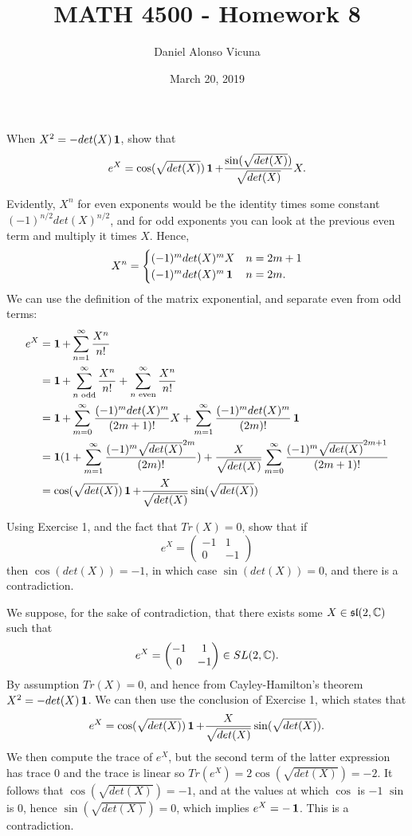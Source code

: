 \documentclass[12pt,onecolumn]{article}
\title{MATH 4500 - Homework 8}
\author{Daniel Alonso Vicuna}
\date{March 20, 2019}
\begin{document}
\maketitle

\begin{exercise}
When $X^2 = -det(X)\operatorname{\mathbf{1}}$, show that 
$$e^X = \cos(\sqrt{ det(X) })\operatorname{\mathbf{1}}+ \frac{\sin(\sqrt{ det(X) })}{\sqrt{det(X)}}
X.$$
\end{exercise}
\begin{answer}
Evidently, $X^n$ for even exponents would be the identity times some constant $(-1)^{n/2}det(X)^{n/2}$, and for odd exponents you can look at the previous even term and multiply it times $X$. Hence,  
$$X^n = 
\begin{cases}
    (-1)^mdet(X)^m X & n = 2m+1\\
    (-1)^mdet(X)^m \operatorname{\mathbf{1}} & n = 2m.
\end{cases}$$
We can use the definition of the matrix exponential, and separate even from odd terms:
\begin{align*}
    e^X &= \operatorname{\mathbf{1}} + \sum_{n=1}^\infty \frac{X^n}{n!} \\
    &= \operatorname{\mathbf{1}} + \sum_{n\text{ odd}}^\infty \frac{X^n}{n!}+ \sum_{n\text{ even}}^\infty \frac{X^n}{n!} \\
    &= \operatorname{\mathbf{1}} + \sum_{m=0}^\infty \frac{(-1)^{m}det(X)^{m}}{(2m+1)!}X + \sum_{m=1}^\infty \frac{(-1)^{m}det(X)^{m}}{(2m)!} \operatorname{\mathbf{1}} \\
    &= \operatorname{\mathbf{1}}(1 +  \sum_{m=1}^\infty \frac{(-1)^{m}\sqrt{det(X)}^{2m}}{(2m)!}) + \frac{X}{\sqrt{det(X)}}\sum_{m=0}^\infty \frac{(-1)^{m}\sqrt{det(X)}^{2m+1}}{(2m+1)!} \\
    &= \cos(\sqrt{det(X)})\operatorname{\mathbf{1}} + \frac{X}{\sqrt{det(X)}}\sin(\sqrt{det(X)})
\end{align*}
\end{answer}
\begin{exercise}
Using Exercise 1, and the fact that $Tr(X)=0$, show that if $$e^X =\begin{pmatrix}-1 & 1\\ 0 & -1\end{pmatrix}$$ then $\cos(det(X))=-1$, in which case $\sin(det(X))=0$, and there is a contradiction. 
\end{exercise}
\begin{answer}
We suppose, for the sake of contradiction, that there exists some $X \in \mathfrak{sl}(2,\operatorname{\mathbb{C}})$ such that $$ e^X = \begin{pmatrix}
    -1 & 1 \\
    0 & -1
\end{pmatrix} \in SL(2,\operatorname{\mathbb{C}}).$$ By assumption $Tr(X) = 0$, and hence from Cayley-Hamilton's theorem $X^2 = -det(X)\operatorname{\mathbf{1}}$. We can then use the conclusion of Exercise 1, which states that
$$ e^X = \cos(\sqrt{det(X)})\operatorname{\mathbf{1}} + \frac{X}{\sqrt{det(X)}}\sin(\sqrt{det(X)}). $$
We then compute the trace of $e^X$, but the second term of the latter expression has trace 0 and the trace is linear so $Tr(e^X) = 2 \cos(\sqrt{det(X)}) = -2$. It follows that $\cos(\sqrt{det(X)}) = -1$, and at the values at which $\cos$ is $-1$ $\sin$ is 0, hence $\sin(\sqrt{det(X)}) = 0$, which implies $e^X = -\operatorname{\mathbf{1}}$. This is a contradiction.
\end{answer}
\end{document}
